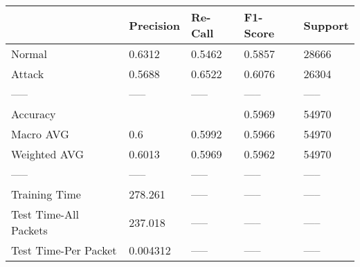 \begin{tabular}{lllll}
\toprule
{} & Precision & Re-Call & F1-Score & Support \\
\midrule
Normal                &    0.6312 &  0.5462 &   0.5857 &   28666 \\
Attack                &    0.5688 &  0.6522 &   0.6076 &   26304 \\
-----                 &     ----- &   ----- &    ----- &   ----- \\
Accuracy              &           &         &   0.5969 &   54970 \\
Macro AVG             &       0.6 &  0.5992 &   0.5966 &   54970 \\
Weighted AVG          &    0.6013 &  0.5969 &   0.5962 &   54970 \\
-----                 &     ----- &   ----- &    ----- &   ----- \\
Training Time         &   278.261 &   ----- &    ----- &   ----- \\
Test Time-All Packets &   237.018 &   ----- &    ----- &   ----- \\
Test Time-Per Packet  &  0.004312 &   ----- &    ----- &   ----- \\
\bottomrule
\end{tabular}
